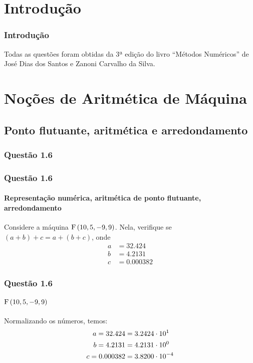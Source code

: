 \section {Introdução}

\begin{frame}
\frametitle{Introdução}
Todas as questões foram obtidas da 3ª edição do livro ``Métodos Numéricos'' de
José Dias dos Santos e Zanoni Carvalho da Silva.
\end{frame}

\section{Noções de Aritmética de Máquina}
\subsection[Ponto flutuante]{Ponto flutuante, aritmética e arredondamento}

\subsubsection{Questão 1.6}

\begin{frame}
\frametitle{Questão 1.6}
\framesubtitle{Representação numérica, aritmética de ponto flutuante,
arredondamento}

Considere a máquina $\mathrm{F}\left(10,5,-9,9\right)$. Nela, verifique se 
$(a+b)+c = a + (b+c)$, onde
\begin{align*}
a &= 32.424\\
b &= 4.2131\\
c &= 0.000382
\end{align*} 

\end{frame}

\begin{frame}
\frametitle{Questão 1.6}
\framesubtitle{$\mathrm{F}\left(10,5,-9,9\right)$}

Normalizando os números, temos:
\begin{align*}
a = 32.424 &= 3.2424 \cdot 10^{1}\\
b = 4.2131 &= 4.2131 \cdot 10^{0}\\
c = 0.000382 &= 3.8200 \cdot 10^{-4}
\end{align*} 


\end{frame}

